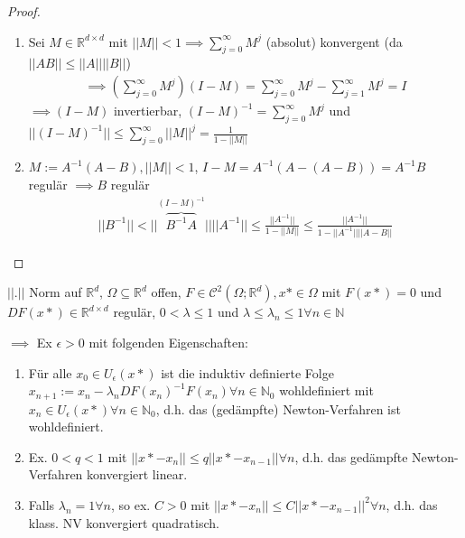 \begin{proof}
	\begin{enumerate}
		\item Sei $M \in \mathbb{R}^{d\times d}$ mit $||M|| < 1 \implies \sum_{j=0}^{\infty} M^j$ (absolut) konvergent (da $||AB|| \leq ||A|| ||B||$)
		\begin{align*}
			\implies \left( \sum_{j=0}^{\infty} M^j \right) (I-M) = \sum_{j=0}^{\infty} M^j - \sum_{j=1}^{\infty} M^j = I
		\end{align*}
		$\implies (I-M)$ invertierbar, $(I-M)^{-1} = \sum_{j=0}^{\infty} M^j$ und $||(I-M)^{-1}|| \leq \sum_{j=0}^{\infty} ||M||^j = \frac{1}{1-||M||}$
		
		\item $M := A^{-1}(A-B), ||M|| < 1$, $I-M = A^{-1}(A - (A-B)) = A^{-1}B$ regulär $\implies B$ regulär
		\begin{align*}
			||B^{-1}|| < ||\overbrace{B^{-1}A}^{(I-M)^{-1}}|| ||A^{-1}|| \leq \frac{||A^{-1}||}{1 - ||M||} \leq \frac{||A^{-1}||}{1 - ||A^{-1}|| ||A-B||}
		\end{align*}
	\end{enumerate}
\end{proof}

\begin{theorem}
	$||.||$ Norm auf $\mathbb{R}^d$, $\Omega \subseteq \mathbb{R}^d$ offen, $F \in \mathcal{C}^2(\Omega; \mathbb{R}^d), x* \in \Omega$ mit $F(x*) = 0$ und $DF(x*) \in \mathbb{R}^{d\times d}$ regulär, $0 < \lambda \leq 1$ und $\lambda \leq \lambda_n \leq 1 \forall n \in \mathbb{N}$
	
	$\implies$ Ex $\epsilon > 0$ mit folgenden Eigenschaften:
	\begin{enumerate}
		\item Für alle $x_0 \in U_\epsilon(x*)$ ist die induktiv definierte Folge $x_{n+1} := x_n - \lambda_n DF(x_n)^{-1} F(x_n) \forall n \in \mathbb{N}_0$ wohldefiniert mit $x_n \in U_\epsilon(x*) \forall n \in \mathbb{N}_0$, d.h. das (gedämpfte) Newton-Verfahren ist wohldefiniert.
		\item Ex. $0 < q < 1$ mit $||x* - x_n|| \leq q ||x* - x_{n-1}|| \forall n$, d.h. das gedämpfte Newton-Verfahren konvergiert linear.
		\item Falls $\lambda_n = 1 \forall n$, so ex. $C>0$ mit $||x* - x_n|| \leq C ||x* - x_{n-1}||^2 \forall n$, d.h. das klass. NV konvergiert quadratisch.
	\end{enumerate}
\end{theorem}


